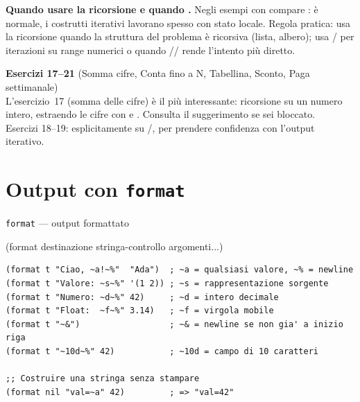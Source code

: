 \begin{attenzione}
\textbf{Quando usare la ricorsione e quando .}
Negli esempi con  compare : è normale,
i costrutti iterativi lavorano spesso con stato locale.
Regola pratica: usa la ricorsione quando la struttura del problema
è ricorsiva (lista, albero); usa / per iterazioni
su range numerici o quando //
rende l'intento più diretto.
\end{attenzione}

\begin{workbook}
\textbf{Esercizi 17--21}
(Somma cifre, Conta fino a N, Tabellina, Sconto, Paga settimanale)\\[4pt]
L'esercizio~17 (somma delle cifre) è il più interessante:
ricorsione su un numero intero, estraendo le cifre con
 e . Consulta il suggerimento se sei bloccato.\\[4pt]
Esercizi 18--19: esplicitamente su /,
per prendere confidenza con l'output iterativo.
\end{workbook}

\section{Output con \texttt{format}}

\begin{concetto}{\texttt{format} --- output formattato}

\begin{sintassi}
(format destinazione stringa-controllo argomenti...)
\end{sintassi}

\end{concetto}

\begin{esempio}
\begin{lstlisting}
(format t "Ciao, ~a!~%"  "Ada")  ; ~a = qualsiasi valore, ~% = newline
(format t "Valore: ~s~%" '(1 2)) ; ~s = rappresentazione sorgente
(format t "Numero: ~d~%" 42)     ; ~d = intero decimale
(format t "Float:  ~f~%" 3.14)   ; ~f = virgola mobile
(format t "~&")                  ; ~& = newline se non gia' a inizio riga
(format t "~10d~%" 42)           ; ~10d = campo di 10 caratteri

;; Costruire una stringa senza stampare
(format nil "val=~a" 42)         ; => "val=42"
\end{lstlisting}
\end{esempio}

